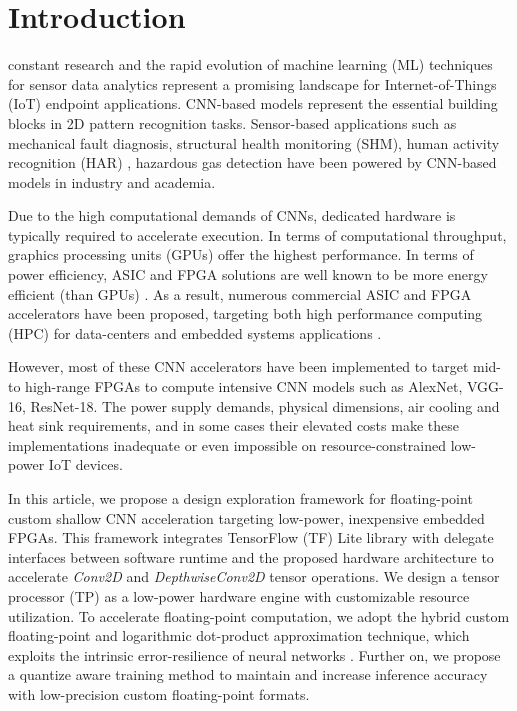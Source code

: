 
\section{Introduction}
\label{sec:introduction}

 constant research and the rapid evolution of machine learning (ML) techniques for sensor data analytics represent a promising landscape for Internet-of-Things (IoT) endpoint applications. CNN-based models represent the essential building blocks in 2D pattern recognition tasks. Sensor-based applications such as mechanical fault diagnosis\cite{li2019sensor,dong2018rolling}, structural health monitoring (SHM)\cite{nagayama2007structural}, human activity recognition (HAR) \cite{wang2019deep}, hazardous gas detection\cite{kim2017hazardous} have been powered by CNN-based models in industry and academia.

Due to the high computational demands of CNNs, dedicated hardware is typically required to accelerate execution. In terms of computational throughput, graphics processing units (GPUs) offer the highest performance. In terms of power efficiency, ASIC and FPGA solutions are well known to be more energy efficient (than GPUs) \cite{nurvitadhi2017can}. As a result, numerous commercial ASIC and FPGA accelerators have been proposed, targeting both high performance computing (HPC) for data-centers and embedded systems applications \cite{abdelouahab2018accelerating, guo2017angel}.

However, most of these CNN accelerators have been implemented to target mid- to high-range FPGAs to compute intensive CNN models such as AlexNet, VGG-16, ResNet-18. The power supply demands, physical dimensions, air cooling and heat sink requirements, and in some cases their elevated costs make these implementations inadequate or even impossible on resource-constrained low-power IoT devices.

In this article, we propose a design exploration framework for floating-point custom shallow CNN acceleration targeting low-power, inexpensive embedded FPGAs. This framework integrates TensorFlow (TF) Lite library with delegate interfaces between software runtime and the proposed hardware architecture to accelerate \emph{Conv2D} and \emph{DepthwiseConv2D} tensor operations. We design a tensor processor (TP) as a low-power hardware engine with customizable resource utilization. To accelerate floating-point computation, we adopt the hybrid custom floating-point and logarithmic dot-product approximation technique\cite{nevarez2021accelerating}, which exploits the intrinsic error-resilience of neural networks \cite{venkataramani2015approximate}. Further on, we propose a quantize aware training method to maintain and increase inference accuracy with low-precision custom floating-point formats.

